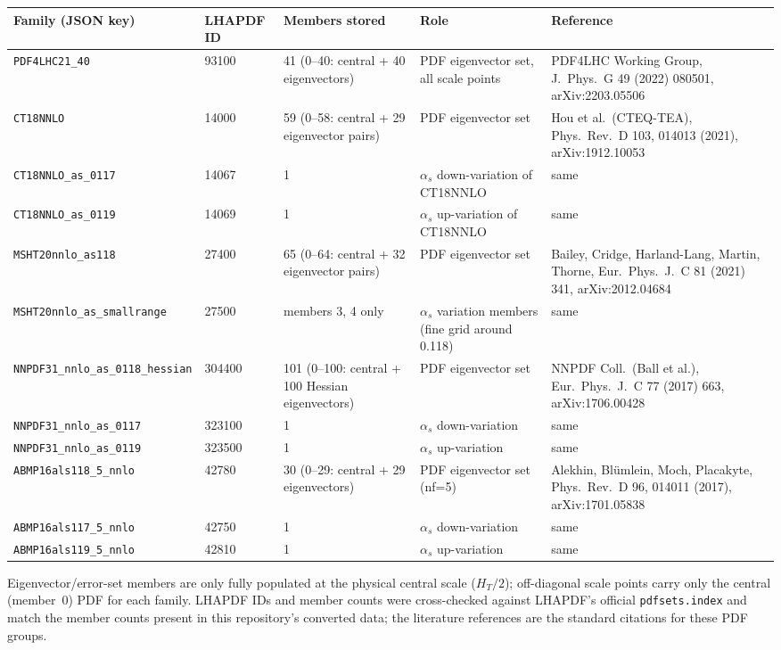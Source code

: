 \documentclass[11pt,a4paper]{article}
\newcommand{\code}[1]{\texttt{#1}}
\begin{document}
\begin{table}[h]
\centering
\small
\begin{tabular}{@{}llp{2.7cm}p{4.3cm}p{4.5cm}@{}}
\toprule
Family (JSON key) & LHAPDF ID & Members stored & Role & Reference \\
\midrule
\code{PDF4LHC21\_40} & 93100 & 41 (0--40: central + 40 eigenvectors) & PDF eigenvector set, all scale points & PDF4LHC Working Group, J.\ Phys.\ G 49 (2022) 080501, arXiv:2203.05506 \\
\code{CT18NNLO} & 14000 & 59 (0--58: central + 29 eigenvector pairs) & PDF eigenvector set & Hou et al.\ (CTEQ-TEA), Phys.\ Rev.\ D 103, 014013 (2021), arXiv:1912.10053 \\
\code{CT18NNLO\_as\_0117} & 14067 & 1 & $\alpha_s$ down-variation of CT18NNLO & same \\
\code{CT18NNLO\_as\_0119} & 14069 & 1 & $\alpha_s$ up-variation of CT18NNLO & same \\
\code{MSHT20nnlo\_as118} & 27400 & 65 (0--64: central + 32 eigenvector pairs) & PDF eigenvector set & Bailey, Cridge, Harland-Lang, Martin, Thorne, Eur.\ Phys.\ J.\ C 81 (2021) 341, arXiv:2012.04684 \\
\code{MSHT20nnlo\_as\_smallrange} & 27500 & members 3, 4 only & $\alpha_s$ variation members (fine grid around 0.118) & same \\
\code{NNPDF31\_nnlo\_as\_0118\_hessian} & 304400 & 101 (0--100: central + 100 Hessian eigenvectors) & PDF eigenvector set & NNPDF Coll.\ (Ball et al.), Eur.\ Phys.\ J.\ C 77 (2017) 663, arXiv:1706.00428 \\
\code{NNPDF31\_nnlo\_as\_0117} & 323100 & 1 & $\alpha_s$ down-variation & same \\
\code{NNPDF31\_nnlo\_as\_0119} & 323500 & 1 & $\alpha_s$ up-variation & same \\
\code{ABMP16als118\_5\_nnlo} & 42780 & 30 (0--29: central + 29 eigenvectors) & PDF eigenvector set (nf=5) & Alekhin, Bl\"umlein, Moch, Placakyte, Phys.\ Rev.\ D 96, 014011 (2017), arXiv:1701.05838 \\
\code{ABMP16als117\_5\_nnlo} & 42750 & 1 & $\alpha_s$ down-variation & same \\
\code{ABMP16als119\_5\_nnlo} & 42810 & 1 & $\alpha_s$ up-variation & same \\
\bottomrule
\end{tabular}
\end{table}

\noindent Eigenvector/error-set members are only fully populated at the
physical central scale ($H_T/2$); off-diagonal scale points carry only the
central (member~0) PDF for each family. LHAPDF IDs and member counts were
cross-checked against LHAPDF's official \code{pdfsets.index} and match the
member counts present in this repository's converted data; the literature
references are the standard citations for these PDF groups.
\end{document}
